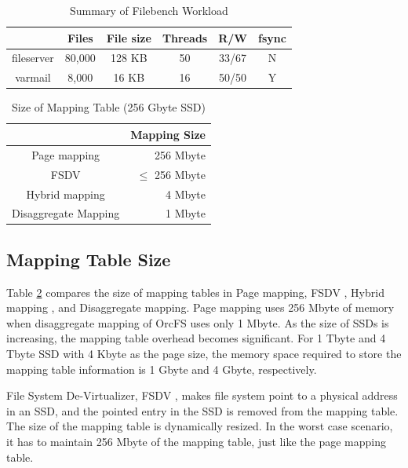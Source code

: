 \documentclass[prodmode,acmtecs]{acmsmall}
\begin{document}
\begin{table}[t]
\begin{center}
\begin{tabular}{|c|c|c|c|c|c|} \hline
  		     & Files	& File size & Threads & R/W   & fsync 		\\ \hline\hline
  fileserver	& 80,000	& 128 KB	   & 50	    & 33/67 & N\\ \hline
  varmail 	& 8,000	& 16 KB     & 16	    & 50/50 & Y\\ \hline
\end{tabular}
\end{center}
\caption{Summary of Filebench Workload}
\label{tab:filebench}
\end{table}

\begin{table}[t]
\begin{center}
  \begin{tabular}{|c|r|} \hline 
                         & Mapping Size       \\ \hline\hline 
Page mapping             & 256 Mbyte          \\ \hline 
FSDV \cite{zhangremoving} & $\leq$ 256 Mbyte  	\\ \hline 
Hybrid mapping \cite{last08} & 4 Mbyte \\ \hline 
Disaggregate Mapping     & 1 Mbyte            \\ \hline
\end{tabular}
\end{center}
\caption{Size of Mapping Table (256 Gbyte SSD)}
\label{tab:meta_size}
\end{table}

\subsection{Mapping Table Size}

Table \ref{tab:meta_size} compares the size of mapping tables in Page
mapping, FSDV \cite{zhangremoving}, Hybrid mapping \cite{last08}, and
Disaggregate mapping.  Page mapping uses 256 Mbyte of memory when
disaggregate mapping of OrcFS uses only 1 Mbyte. As the size of SSDs
is increasing, the mapping table overhead becomes significant.  For 1
Tbyte and 4 Tbyte SSD with 4 Kbyte as the page size, the memory space
required to store the mapping table information is 1 Gbyte and 4
Gbyte, respectively.

File System De-Virtualizer, FSDV \cite{zhangremoving}, makes file
system point to a physical address in an SSD, and the pointed entry in
the SSD is removed from the mapping table. The size of the mapping
table is dynamically resized. In the worst case scenario, it has to
maintain 256 Mbyte of the mapping table, just like the page mapping
table.
\end{document}
